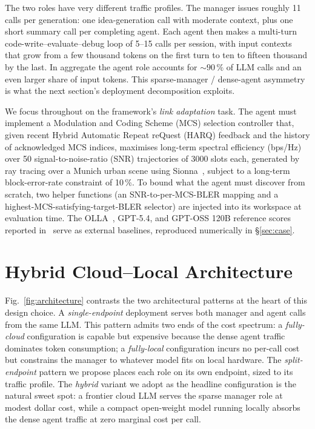 \documentclass[journal]{IEEEtran}
\begin{document}
The two roles have very different traffic profiles. The manager issues roughly 11 calls per generation: one idea-generation call with moderate context, plus one short summary call per completing agent. Each agent then makes a multi-turn code-write--evaluate--debug loop of 5--15 calls per session, with input contexts that grow from a few thousand tokens on the first turn to ten to fifteen thousand by the last. In aggregate the agent role accounts for ${\sim}90\,\%$ of LLM calls and an even larger share of input tokens. This sparse-manager / dense-agent asymmetry is what the next section's deployment decomposition exploits.

We focus throughout on the framework's \emph{link adaptation} task. The agent must implement a Modulation and Coding Scheme (MCS) selection controller that, given recent Hybrid Automatic Repeat reQuest (HARQ) feedback and the history of acknowledged MCS indices, maximises long-term spectral efficiency (bps/Hz) over 50 signal-to-noise-ratio (SNR) trajectories of 3000 slots each, generated by ray tracing over a Munich urban scene using Sionna~\cite{sionna}, subject to a long-term block-error-rate constraint of 10\,\%. To bound what the agent must discover from scratch, two helper functions (an SNR-to-per-MCS-BLER mapping and a highest-MCS-satisfying-target-BLER selector) are injected into its workspace at evaluation time. The OLLA~\cite{sampath1997olla}, GPT-5.4, and GPT-OSS 120B reference scores reported in~\cite{aitaoudia2026aite} serve as external baselines, reproduced numerically in \S\ref{sec:case}.

\section{Hybrid Cloud--Local Architecture}
\label{sec:hybrid}

Fig.~\ref{fig:architecture} contrasts the two architectural patterns at the heart of this design choice. A \emph{single-endpoint} deployment serves both manager and agent calls from the same LLM. This pattern admits two ends of the cost spectrum: a \emph{fully-cloud} configuration is capable but expensive because the dense agent traffic dominates token consumption; a \emph{fully-local} configuration incurs no per-call cost but constrains the manager to whatever model fits on local hardware. The \emph{split-endpoint} pattern we propose places each role on its own endpoint, sized to its traffic profile. The \emph{hybrid} variant we adopt as the headline configuration is the natural sweet spot: a frontier cloud LLM serves the sparse manager role at modest dollar cost, while a compact open-weight model running locally absorbs the dense agent traffic at zero marginal cost per call.
\end{document}
